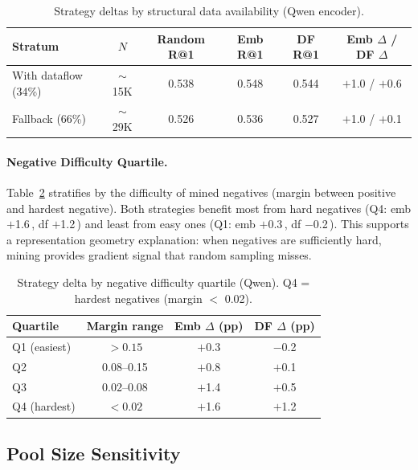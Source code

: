 \documentclass[11pt]{article}
\newcommand{\pp}{\,\text{pp}}
\begin{document}
\begin{table}[t]
\centering
\caption{Strategy deltas by structural data availability (Qwen encoder).}
\label{tab:strat-structural}
\begin{tabular}{lccccc}
\toprule
Stratum & $N$ & Random R@1 & Emb R@1 & DF R@1 & Emb $\Delta$ / DF $\Delta$ \\
\midrule
With dataflow (34\%) & $\sim$15K & 0.538 & 0.548 & 0.544 & $+$1.0 / $+$0.6 \\
Fallback (66\%)      & $\sim$29K & 0.526 & 0.536 & 0.527 & $+$1.0 / $+$0.1 \\
\bottomrule
\end{tabular}
\end{table}

\paragraph{Negative Difficulty Quartile.}
Table~\ref{tab:strat-negdiff} stratifies by the difficulty of mined negatives (margin between positive and hardest negative).
Both strategies benefit most from hard negatives (Q4: emb $+$1.6\pp{}, df $+$1.2\pp{}) and least from easy ones (Q1: emb $+$0.3\pp{}, df $-$0.2\pp{}).
This supports a representation geometry explanation: when negatives are sufficiently hard, mining provides gradient signal that random sampling misses.

\begin{table}[t]
\centering
\caption{Strategy delta by negative difficulty quartile (Qwen). Q4 = hardest negatives (margin $<$ 0.02).}
\label{tab:strat-negdiff}
\begin{tabular}{lccc}
\toprule
Quartile & Margin range & Emb $\Delta$ (pp) & DF $\Delta$ (pp) \\
\midrule
Q1 (easiest) & $> 0.15$      & $+$0.3 & $-$0.2 \\
Q2           & 0.08--0.15    & $+$0.8 & $+$0.1 \\
Q3           & 0.02--0.08    & $+$1.4 & $+$0.5 \\
Q4 (hardest) & $< 0.02$      & $+$1.6 & $+$1.2 \\
\bottomrule
\end{tabular}
\end{table}

\subsection{Pool Size Sensitivity}
\label{sec:poolsize}
\end{document}
